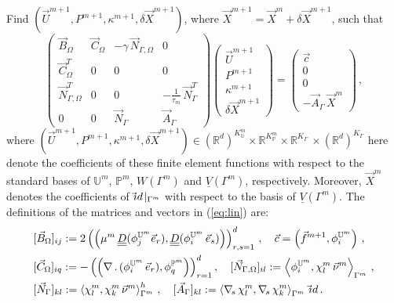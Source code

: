 \documentclass[a4paper,11pt,onecolumn]{article}
\newcommand{\R}{{\mathbb R}}
\newcommand{\Vh}{\underline{V}(\Gamma^m)}
\newcommand{\Wh}{W(\Gamma^m)}
\newcommand{\uspace}{\mathbb{U}}
\newcommand{\pspace}{\mathbb{P}}
\newcommand{\nabs}{\nabla_{\!s}}
\newcommand{\id}{\rm id}
\newcommand{\NbulkT}{\vec{N}_{\Gamma,\Omega}^T}
\newcommand{\Nbulk}{\vec{N}_{\Gamma,\Omega}}
\newcommand{\mat}[1]{\underline{\underline{#1}}\rule{0pt}{0pt}}
\begin{document}
Find $(\vec U^{m+1},P^{m+1}, \kappa^{m+1},\delta\vec{X}^{m+1})$, where $\vec
X^{m+1} = \vec X^m+ \delta\vec X^{m+1}$, such that
\begin{equation}
\begin{pmatrix}
\vec B_\Omega & \vec C_\Omega & -\gamma\,\Nbulk & 0 \\
\vec C^T_\Omega & 0 & 0 & 0 \\
\NbulkT & 0 & 0 & -\frac1{\tau_m}\,\vec{N}_\Gamma^T \\
0 & 0 & \vec{N}_\Gamma & \vec{A}_\Gamma
\end{pmatrix}
\begin{pmatrix}
\vec U^{m+1} \\
P^{m+1} \\
\kappa^{m+1} \\
\delta\vec{X}^{m+1}
\end{pmatrix}
=
\begin{pmatrix}
\vec c \\
0 \\
0 \\
-\vec{A}_\Gamma\,\vec X^m
\end{pmatrix} \,,
\label{eq:lin}
\end{equation}
where $(\vec U^{m+1},P^{m+1},\kappa^{m+1},\delta\vec{X}^{m+1})\in
(\R^d)^{K^m_\uspace}\times \R^{K^m_\pspace} \times \R^{K_\Gamma}\,\times
(\R^d)^{K_\Gamma}$ here denote the coefficients of these finite element
functions with respect to the standard bases of $\uspace^m$, $\pspace^m$, $\Wh$
and $\Vh$, respectively. Moreover, $\vec X^m$ denotes the coefficients of
$\vec\id\!\mid_{\Gamma^m}$ with respect to the basis of $\Vh$. The definitions
of the matrices and vectors in (\ref{eq:lin}) are:
\begin{align*}
& [\vec B_\Omega]_{ij} := 2\left(\left(\mu^m\,\mat D(\phi_j^{\uspace^m} \vec
e_r), \mat D( \phi_i^{\uspace^m}\,\vec e_s) \right) \right)_{r,s=1}^d\,,\quad
\vec c = \left( \vec f^{m+1},\phi_i^{\uspace^m}\right)\,,\\
&[\vec C_\Omega]_{iq} := - \left( \left(\nabla\,.\,(\phi_i^{\uspace^m}\,\vec
e_r), \phi_q^{\pspace^m} \right) \right)_{r=1}^d,\quad
[\Nbulk]_{il} := \left\langle \phi_i^{\uspace^m}, \chi^m_l \,\vec\nu^m
\right\rangle_{\Gamma^m} \,,\\
& [\vec{N}_\Gamma]_{kl} := \left\langle \chi^m_l, \chi^m_k\,\vec\nu^m
\right\rangle_{\Gamma^m}^h \,,\quad [\vec{A}_\Gamma]_{kl} := \left\langle
\nabs\,\chi^m_l, \nabs\,\chi^m_k \right\rangle_{\Gamma^m} \,\vec\id \,.
\end{align*}
\end{document}
